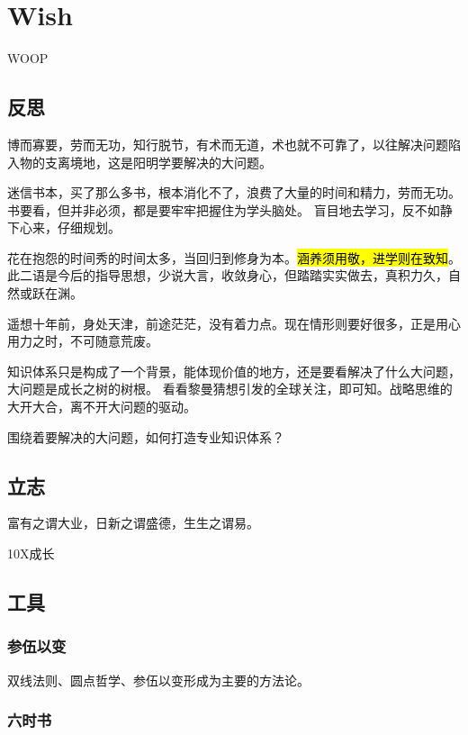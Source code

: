 \chapter{Wish}

WOOP

\section{反思}

博而寡要，劳而无功，知行脱节，有术而无道，术也就不可靠了，以往解决问题陷入物的支离境地，这是阳明学要解决的大问题。

迷信书本，买了那么多书，根本消化不了，浪费了大量的时间和精力，劳而无功。
书要看，但并非必须，都是要牢牢把握住为学头脑处。
盲目地去学习，反不如静下心来，仔细规划。

花在抱怨的时间秀的时间太多，当回归到修身为本。\hl{涵养须用敬，进学则在致知}。
此二语是今后的指导思想，少说大言，收敛身心，但踏踏实实做去，真积力久，自然或跃在渊。

遥想十年前，身处天津，前途茫茫，没有着力点。现在情形则要好很多，正是用心用力之时，不可随意荒废。

知识体系只是构成了一个背景，能体现价值的地方，还是要看解决了什么大问题，大问题是成长之树的树根。
看看黎曼猜想引发的全球关注，即可知。战略思维的大开大合，离不开大问题的驱动。

围绕着要解决的大问题，如何打造专业知识体系？

\section{立志}

富有之谓大业，日新之谓盛德，生生之谓易。

10X成长

\section{工具}

\subsection{参伍以变}

双线法则、圆点哲学、参伍以变形成为主要的方法论。

\subsection{六时书}

